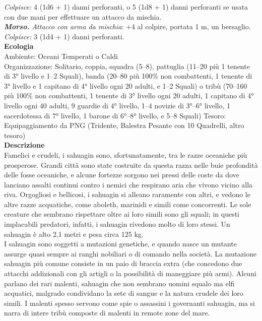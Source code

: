 \begin{multicols}{2}
\emph{Colpisce:} 4 (1d6 + 1) danni perforanti, o 5 (1d8 + 1) danni perforanti se usata con due mani per effettuare un attacco da mischia.\\

\emph{\textbf{Morso.} Attacco con arma da mischia}: +4 al colpire, portata 1 m, un bersaglio.\\

\emph{Colpisce:} 3 (1d4 + 1) danni perforanti.\\
\textbf{Ecologia}\\
Ambiente: Oceani Temperati o Caldi\\
Organizzazione: Solitario, coppia, squadra (5–8), pattuglia (11–20 più 1 tenente di 3° livello e 1–2 Squali), banda (20–80 più 100\% non combattenti, 1 tenente di 3° livello e 1 capitano di 4° livello ogni 20 adulti, e 1–2 Squali) o tribù (70–160 più 100\% non combattenti, 1 tenente di 3° livello ogni 20 adulti, 1 capitano di 4° livello ogni 40 adulti, 9 guardie di 4° livello, 1–4 novizie di 3°–6° livello, 1 sacerdotessa di 7° livello, 1 barone di 6°–8° livello, e 5–8 Squali)
Tesoro: Equipaggiamento da PNG (Tridente, Balestra Pesante con 10 Quadrelli, altro tesoro)\\
\textbf{Descrizione}\\
Famelici e crudeli, i sahuagin sono, sfortunatamente, tra le razze oceaniche più prosperose. Grandi città sono state costruite da questa razza nelle buie profondità delle fosse oceaniche, e alcune fortezze sorgono nei pressi delle coste da dove lanciano assalti continui contro i nemici che respirano aria che vivono vicino alla riva. Orgogliosi e bellicosi, i sahuagin si alleano raramente con altri, e vedono le altre razze acquatiche, come aboleth, marinidi e simili come concorrenti. Le sole creature che sembrano rispettare oltre ai loro simili sono gli squali; in questi implacabili predatori, infatti, i sahuagin rivedono molto di loro stessi. Un sahuagin è alto 2,1 metri e pesa circa 125 kg.\\

I sahuagin sono soggetti a mutazioni genetiche, e quando nasce un mutante assurge quasi sempre ai ranghi nobiliari o di comando nella società. La mutazione sahuagin più comune consiste in un paio di braccia extra (che concedono due attacchi addizionali con gli artigli o la possibilità di maneggiare più armi). Alcuni parlano dei rari malenti, sahuagin che non sembrano uomini squalo ma elfi acquatici, malgrado condividano la sete di sangue e la natura crudele dei loro simili. I malenti spesso servono come spie o assassini i governanti sahuagin, ma si narra di intere tribù composte di malenti in remote zone del mare.\\


\end{multicols}
